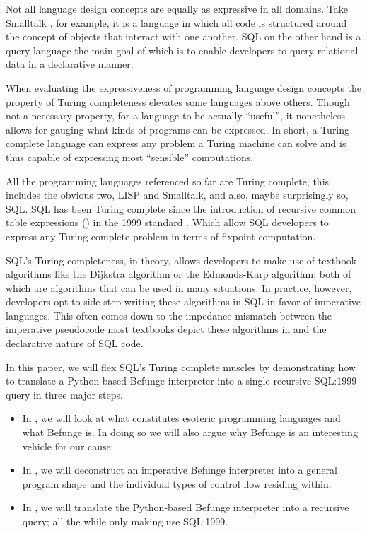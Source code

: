 \documentclass[sigconf,nonacm,screen,review,balance=false]{acmart}
\begin{document}
Not all language design concepts are equally as expressive in all domains. Take
Smalltalk \cite{kay1993smalltalk}, for example, it is a language in which all
code is structured around the concept of objects that interact with one
another. SQL \cite{chamberlin2012historysql} on the other hand is a query
language the main goal of which is to enable developers to query relational
data in a declarative manner.

When evaluating the expressiveness of programming language design concepts the
property of Turing completeness elevates some languages above others. Though
not a necessary property, for a language to be actually ``useful'', it
nonetheless allows for gauging what kinds of programs can be expressed. In
short, a Turing complete language can express any problem a Turing machine can
solve and is thus capable of expressing most ``sensible'' computations.

All the programming languages referenced so far are Turing complete, this
includes the obvious two, LISP and Smalltalk, and also, maybe surprisingly so,
SQL. SQL has been Turing complete since the introduction of recursive common
table expressions () in the 1999 standard \cite
{sql-1999}. Which allow SQL developers to express any Turing complete problem
in terms of fixpoint computation.

SQL's Turing completeness, in theory, allows developers to make use of textbook
algorithms like the Dijkstra algorithm or the Edmonds-Karp algorithm; both of
which are algorithms that can be used in many situations. In practice, however,
developers opt to side-step writing these algorithms in SQL in favor of
imperative languages. This often comes down to the impedance mismatch between
the imperative pseudocode most textbooks depict these algorithms in and the
declarative nature of SQL code.

In this paper, we will flex SQL's Turing complete muscles by demonstrating how to
translate a Python-based Befunge interpreter into a single recursive SQL:1999
query in three major steps.
\begin{itemize}
  \item In , we will look at what constitutes esoteric
        programming languages and what Befunge is. In doing so we will also
        argue why Befunge is an interesting vehicle for our cause.
  \item In , we will deconstruct an imperative Befunge
        interpreter into a general program shape and the individual types of
        control flow residing within.
  \item In , we will translate the Python-based Befunge
        interpreter into a recursive query; all the while only making
        use SQL:1999.
\end{itemize}
\end{document}
